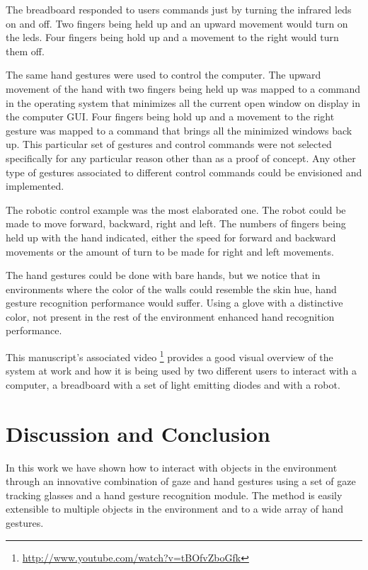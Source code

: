 \documentclass[jou,a4paper,notxfonts]{apa}
\begin{document}
The breadboard responded to users commands just by turning the infrared leds on and off. Two fingers being held up and
an upward movement would turn on the leds. Four fingers being hold up and a movement to the right would turn them off.

The same hand gestures were used to control the computer. The upward movement of the hand with two fingers being held up
was mapped to a command in the operating system that minimizes all the current open window on display in the computer
GUI. Four fingers being hold up and a movement to the right gesture was mapped to a command that brings all the
minimized windows back up. This particular set of gestures and control commands were not selected specifically for
any particular reason other than as a proof of concept. Any other type of gestures associated to different
control commands could be envisioned and implemented.

The robotic control example was the most elaborated one. The robot could be made to move forward, backward, right and
left. The numbers of fingers being held up with the hand indicated, either the speed for forward and backward movements
or the amount of turn to be made for right and left movements.

The hand gestures could be done with bare hands, but we notice that in environments where the color of the walls could
resemble the skin hue, hand gesture recognition performance would suffer. Using a glove with a distinctive color, not 
present in the rest of the environment enhanced hand recognition performance.

This manuscript's associated video \footnote{\url{http://www.youtube.com/watch?v=tBOfvZboGfk}} provides a good visual
overview of the system at work and how it is being used by two different users to interact with a computer, a breadboard
with a set of light emitting diodes and with a robot.


\section{Discussion and Conclusion}
In this work we have shown how to interact with objects in the environment through an innovative combination of gaze and
hand gestures using a set of gaze tracking glasses and a hand gesture recognition module. The method is easily
extensible to multiple objects in the environment and to a wide array of hand gestures.
\end{document}
